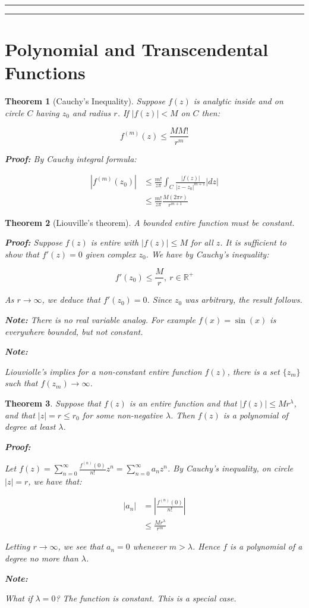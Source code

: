 \documentclass{article}
\newtheorem{theorem}{Theorem}[section]
\theoremstyle{definition}
\newcommand{\Section}[1]{\hrule\hrule\section{#1}}
\def\R{\mathbb{R}}
\begin{document}

\Section{Polynomial and Transcendental Functions }
\begin{theorem}[Cauchy's Inequality]
Suppose $f(z)$ is analytic inside and on circle $C$ having $z_0$ and radius $r$. If $|f(z)|<M$ on $C$ then:

$$f^{(m)}(z) \leq \frac{MM!}{r^m}$$

\textbf{Proof:}
By Cauchy integral formula:

\begin{align*}
\left|f^{(m)}(z_0)\right| &\leq \frac{m!}{z\pi} \int_{C} \frac{|f(z)|}{|z-z_0|^{m+1}} |dz| \\ 
& \leq \frac{m!}{z\pi}\frac{M(2\pi r)}{r^{m+1}}
\end{align*}
\end{theorem}

\begin{theorem}[Liouville's theorem]
A bounded entire function must be constant.

\textbf{Proof:}
Suppose $f(z)$ is entire with $|f(z)| \leq M$ for all $z$. It is sufficient to show that $f'(z) = 0$ given complex $z_0$. We have by Cauchy's inequality:

$$f'(z_0) \leq \frac{M}{r},\ r \in \R^+$$

As $r \to \infty$, we deduce that $f'(z_0) = 0$. Since $z_0$ was arbitrary, the result follows.

\textbf{Note:}
There is no real variable analog. For example $f(x) = \sin(x)$ is everywhere bounded, but not constant. 

\textbf{Note:}

Liouviolle's implies for a non-constant entire function $f(z)$, there is a set $\{z_m\}$ such that $f(z_m) \to \infty$. 


\end{theorem}

\begin{theorem}
Suppose that $f(z)$ is an entire function and that $|f(z)| \leq Mr^\lambda$, and that $|z| = r \leq r_0$ for some non-negative $\lambda$. Then $f(z)$ is a polynomial of degree at least $\lambda$. 

\textbf{Proof:}

Let $f(z) = \sum_{n=0}^\infty \frac{f^{(n)}(0)}{n!} z^n = \sum_{n=0}^\infty a_n z^n$. By Cauchy's inequality, on circle $|z|=r$, we have that:

\begin{align*}
|a_n| &= \left|\frac{f^{(n)}(0)}{n!}\right| \\
& \leq \frac{Mr^\lambda}{r^m}
\end{align*}

Letting $r \to \infty$, we see that $a_n = 0$ whenever $m>\lambda$. Hence $f$ is a polynomial of a degree no more than $\lambda$.

\textbf{Note:}

What if $\lambda = 0$? The function is constant. This is a special case.
\end{theorem}
\end{document}
